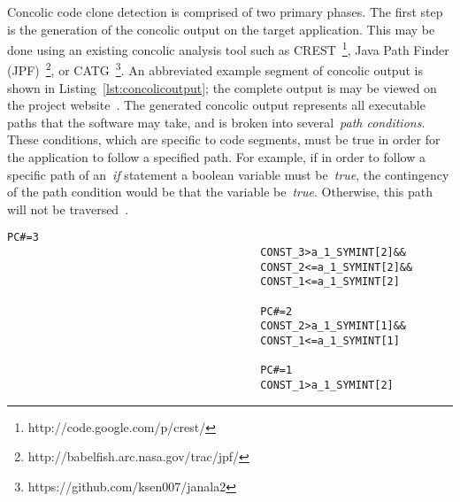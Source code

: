\documentclass[smallextended]{svjour3}       %
\begin{document}
Concolic code clone detection is comprised of two primary phases. The first step is the generation of the concolic output on the target application. This may be done using an existing concolic analysis tool such as CREST~\footnote{http://code.google.com/p/crest/}, Java Path Finder (JPF)~\footnote{http://babelfish.arc.nasa.gov/trac/jpf/}, or CATG~\footnote{https://github.com/ksen007/janala2}. An abbreviated example segment of concolic output is shown in Listing~\ref{lst:concolicoutput}; the complete output is may be viewed on the project website~\cite{cccd_url}. The generated concolic output represents all executable paths that the software may take, and is broken into several~\emph{path conditions}. These conditions, which are specific to code segments, must be true in order for the application to follow a specified path. For example, if in order to follow a specific path of an~\emph{if} statement a boolean variable must be~\emph{true}, the contingency of the path condition would be that the variable be~\emph{true}. Otherwise, this path will not be traversed~\cite{Sen:2005:CCU:1081706.1081750}.


\begin{minipage}{\linewidth}
\begin{lstlisting}[label=lst:concolicoutput, caption=Example Concolic Output]
										PC#=3
										CONST_3>a_1_SYMINT[2]&&
										CONST_2<=a_1_SYMINT[2]&&
										CONST_1<=a_1_SYMINT[2]

										PC#=2
										CONST_2>a_1_SYMINT[1]&&
										CONST_1<=a_1_SYMINT[1]

										PC#=1
										CONST_1>a_1_SYMINT[2]

\end{lstlisting}
\end{minipage}
\end{document}
